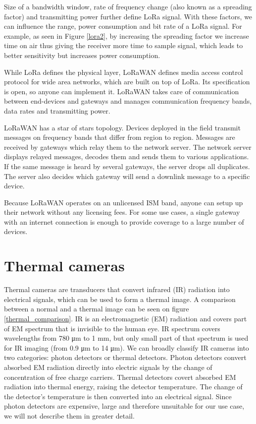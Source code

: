 Size of a bandwidth window, rate of frequency change (also known as a spreading factor) and transmitting power further define LoRa signal.
With these factors, we can influence the range, power consumption and bit rate of a LoRa signal.
For example, as seen in Figure \ref{lora2}, by increasing the spreading factor we increase time on air thus giving the receiver more time to sample signal, which leads to better sensitivity but increases power consumption.

While LoRa defines the physical layer, LoRaWAN defines media access control protocol for wide area networks, which are built on top of LoRa\cite{lora_article}.
Its specification is open, so anyone can implement it.
LoRaWAN takes care of communication between end-devices and gateways and manages communication frequency bands, data rates and transmitting power.

LoRaWAN has a star of stars topology\cite{lora_article}.
Devices deployed in the field transmit messages on frequency bands that differ from region to region. 
Messages are received by gateways which relay them to the network server.
The network server displays relayed messages, decodes them and sends them to various applications.
If the same message is heard by several gateways, the server drops all duplicates.
The server also decides which gateway will send a downlink message to a specific device. 

Because LoRaWAN operates on an unlicensed ISM band, anyone can setup up their network without any licensing fees.
For some use cases, a single gateway with an internet connection is enough to provide coverage to a large number of devices.


\section{ Thermal cameras}

Thermal cameras are transducers that convert infrared (IR) radiation into electrical signals, which can be used to form a thermal image.
A comparison between a normal and a thermal image can be seen on figure \ref{thermal_comparison}.
IR is an electromagnetic (EM) radiation and covers part of EM spectrum that is invisible to the human eye.
IR spectrum covers wavelengths from 780 \si{\micro\meter} to 1 \si{\milli\meter}, but only small part of that spectrum is used for IR imaging (from 0.9 \si{\micro\meter} to 14 \si{\micro\meter})\cite{thermal_book}.
We can broadly classify IR cameras into two categories: photon detectors or thermal detectors\cite{thermal_book}.
Photon detectors convert absorbed EM radiation directly into electric signals by the change of concentration of free charge carriers\cite{thermal_book}.
Thermal detectors covert absorbed EM radiation into thermal energy, raising the detector temperature\cite{thermal_book}. 
The change of the detector's temperature is then converted into an electrical signal.
Since photon detectors are expensive, large and therefore unsuitable for our use case, we will not describe them in greater detail.
\newline 

